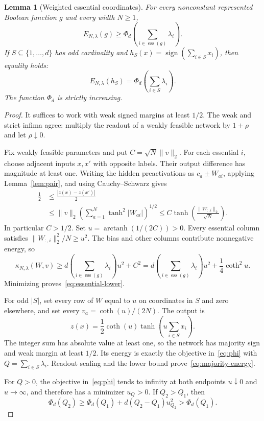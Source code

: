 \documentclass[11pt]{article}
\newtheorem{lemma}[theorem]{Lemma}
\newcommand{\sgn}{\operatorname{sign}}
\newcommand{\ess}{\operatorname{ess}}
\begin{document}
\begin{lemma}[Weighted essential coordinates]\label{lem:essential}
For every nonconstant represented Boolean function $g$ and every width
$N\ge1$,
\begin{equation}\label{eq:essential-lower}
 E_{N,\lambda}(g)\ge
 \Phi_d\!\left(\sum_{i\in\ess(g)}\lambda_i\right).
\end{equation}
If $S\subseteq\{1,\ldots,d\}$ has odd cardinality and
$h_S(x)=\sgn(\sum_{i\in S}x_i)$, then equality holds:
\begin{equation}\label{eq:majority-energy}
 E_{N,\lambda}(h_S)=\Phi_d\!\left(\sum_{i\in S}\lambda_i\right).
\end{equation}
The function $\Phi_d$ is strictly increasing.
\end{lemma}
\begin{proof}
It suffices to work with weak signed margins at least $1/2$.
The weak and strict infima agree: multiply the readout of a weakly
feasible network by $1+\rho$ and let $\rho\downarrow0$.

Fix weakly feasible parameters and put $C=\sqrt N\|v\|_2$.
For each essential $i$, choose adjacent inputs $x,x'$ with opposite
labels. Their output difference has magnitude at least one. Writing
the hidden preactivations as $c_a\pm W_{ai}$, applying
Lemma~\ref{lem:pair}, and using Cauchy--Schwarz gives
\begin{align*}
 \frac12
 &\le\frac{|z(x)-z(x')|}{2}\\
 &\le\|v\|_2\left(\sum_{a=1}^N\tanh^2|W_{ai}|\right)^{1/2}
 \le C\tanh\!\left(\frac{\|W_{:,i}\|_2}{\sqrt N}\right).
\end{align*}
In particular $C>1/2$. Set $u=\operatorname{arctanh}(1/(2C))>0$.
Every essential column satisfies $\|W_{:,i}\|_2^2/N\ge u^2$.
The bias and other columns contribute nonnegative energy, so
\[
 \kappa_{N,\lambda}(W,v)
 \ge d\left(\sum_{i\in\ess(g)}\lambda_i\right)u^2+C^2
 =d\left(\sum_{i\in\ess(g)}\lambda_i\right)u^2+\frac14\coth^2u.
\]
Minimizing proves~\eqref{eq:essential-lower}.

For odd $|S|$, set every row of $W$ equal to $u$ on coordinates in
$S$ and zero elsewhere, and set every $v_a=\coth(u)/(2N)$.
The output is
\[
 z(x)=\frac12\coth(u)\tanh\!\left(u\sum_{i\in S}x_i\right).
\]
The integer sum has absolute value at least one, so the network has
majority sign and weak margin at least $1/2$. Its energy is exactly
the objective in~\eqref{eq:phi} with $Q=\sum_{i\in S}\lambda_i$.
Readout scaling and the lower bound prove~\eqref{eq:majority-energy}.

For $Q>0$, the objective in~\eqref{eq:phi} tends to infinity at both
endpoints $u\downarrow0$ and $u\to\infty$, and therefore has a
minimizer $u_Q>0$. If $Q_2>Q_1$, then
\[
 \Phi_d(Q_2)
 \ge\Phi_d(Q_1)+d(Q_2-Q_1)u_{Q_2}^2>\Phi_d(Q_1).
\]
\end{proof}
\end{document}
